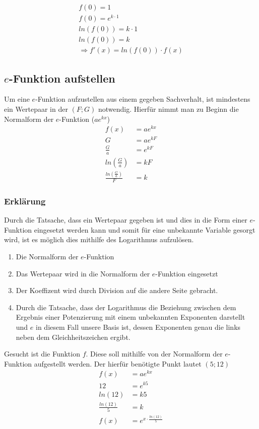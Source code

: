 \begin{beispiel}
\begin{align*}
	f(0)=1\tag{Bedingung}\\
	f(0)=e^{k\cdot 1}\tag{Nach $k$ auflösen}\\
	ln(f(0))=k\cdot 1\tag{Dividieren durch 1}\\
	ln(f(0))=k\\
	\Rightarrow f'(x)=ln(f(0))\cdot f(x)
\end{align*}
\end{beispiel}

\subsection{$e$-Funktion aufstellen}
Um eine $e$-Funktion aufzustellen aus einem gegeben Sachverhalt, ist mindestens ein Wertepaar in der $(F;G)$ notwendig. Hierfür nimmt man zu Beginn die Normalform der $e$-Funktion ($ae^{kx}$)
\begin{align}
	f(x)&=ae^{kx}\\
	G&=ae^{kF}\\
	\frac{G}{a}&=e^{kF}\\
	ln\left(\frac{G}{a}\right)&=kF\\
	\frac{ln\left(\frac{G}{a}\right)}{F}&=k
\end{align}
\subsubsection{Erklärung}
Durch die Tatsache, dass ein Wertepaar gegeben ist und dies in die Form einer $e$-Funktion eingesetzt werden kann und somit für eine unbekannte Variable gesorgt wird, ist es möglich dies mithilfe des Logarithmus aufzulösen.
\begin{enumerate}
	\item Die Normalform der $e$-Funktion
	\item Das Wertepaar wird in die Normalform der $e$-Funktion eingesetzt
	\item Der Koeffizent wird durch Division auf die andere Seite gebracht. 
	\item Durch die Tatsache, dass der Logarithmus die Beziehung zwischen dem Ergebnis einer Potenzierung mit einem unbekannten Exponenten darstellt und $e$ in diesem Fall unsere Basis ist, dessen Exponenten genau die links neben dem Gleichheitszeichen ergibt. 
\end{enumerate}

\begin{beispiel}
	Gesucht ist die Funktion $f$. Diese soll mithilfe von der Normalform der $e$-Funktion aufgestellt werden. Der hierfür benötigte Punkt lautet $(5;12)$
	\begin{align*}
		f(x)&=ae^{kx}\\
		12&=e^{k5}\tag{Anwenden des ln}\\
		ln(12)&=k5\tag{Dividieren mit 5}\\
		\frac{ln(12)}{5}&=k\\
		f(x)&=e^{x\cdot \frac{ln(12)}{5}}
	\end{align*}
\end{beispiel}
\pagebreak
